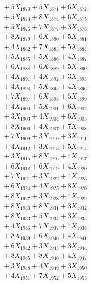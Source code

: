 \documentclass[a4paper,10pt]{article}
\begin{document}
{\begin{align}
&\;  + 5 X_{1870} + 5 X_{1871} + 6 X_{1872} \\[0.3ex]
&\;  + 5 X_{1873} + 8 X_{1874} + 6 X_{1875} \\[0.3ex]
&\;  + 5 X_{1876} + 7 X_{1877} + 3 X_{1878} \\[0.3ex]
&\;  + 8 X_{1879} + 6 X_{1880} + 5 X_{1881} \\[0.3ex]
&\;  + 4 X_{1882} + 7 X_{1883} + 5 X_{1884} \\[0.3ex]
&\;  + 5 X_{1885} + 5 X_{1886} + 4 X_{1887} \\[0.3ex]
&\;  + 6 X_{1888} + 6 X_{1889} + 5 X_{1890} \\[0.3ex]
&\;  + 4 X_{1891} + 4 X_{1892} + 3 X_{1893} \\[0.3ex]
&\;  + 4 X_{1894} + 5 X_{1895} + 4 X_{1896} \\[0.3ex]
&\;  + 7 X_{1897} + 6 X_{1898} + 5 X_{1899} \\[0.5ex]\allowbreak
&\;  + 4 X_{1900} + 5 X_{1901} + 6 X_{1902} \\[0.3ex]
&\;  + 3 X_{1903} + 4 X_{1904} + 6 X_{1905} \\[0.3ex]
&\;  + 8 X_{1906} + 4 X_{1907} + 7 X_{1908} \\[0.3ex]
&\;  + 7 X_{1909} + 3 X_{1910} + 3 X_{1911} \\[0.3ex]
&\;  + 4 X_{1912} + 3 X_{1913} + 5 X_{1914} \\[0.3ex]
&\;  + 3 X_{1915} + 8 X_{1916} + 4 X_{1917} \\[0.3ex]
&\;  + 6 X_{1918} + 6 X_{1919} + 4 X_{1920} \\[0.3ex]
&\;  + 7 X_{1921} + 3 X_{1922} + 4 X_{1923} \\[0.3ex]
&\;  + 6 X_{1924} + 4 X_{1925} + 8 X_{1926} \\[0.3ex]
&\;  + 8 X_{1927} + 3 X_{1928} + 4 X_{1929} \\[0.5ex]\allowbreak
&\;  + 8 X_{1930} + 8 X_{1931} + 3 X_{1932} \\[0.3ex]
&\;  + 8 X_{1933} + 5 X_{1934} + 3 X_{1935} \\[0.3ex]
&\;  + 4 X_{1936} + 7 X_{1937} + 4 X_{1938} \\[0.3ex]
&\;  + 8 X_{1939} + 6 X_{1940} + 4 X_{1941} \\[0.3ex]
&\;  + 6 X_{1942} + 3 X_{1943} + 3 X_{1944} \\[0.3ex]
&\;  + 8 X_{1945} + 8 X_{1946} + 4 X_{1947} \\[0.3ex]
&\;  + 3 X_{1948} + 4 X_{1949} + 3 X_{1950} \\[0.3ex]
&\;  + 4 X_{1951} + 7 X_{1952} + 5 X_{1953} \\[0.3ex]

\end{align}}
\end{document}
